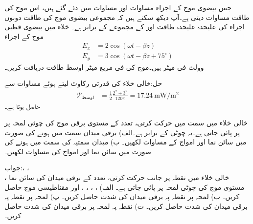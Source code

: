 جس بیضوی موج کے اجزاء مساوات  اور مساوات  میں دئے گئے ہیں، اس موج کی طاقت مساوات  دیتی ہے۔آپ دیکھ سکتے ہیں کہ مجموعی بیضوی موج کی طاقت دونوں اجزاء کی علیحدہ علیحدہ طاقت  اور  کے مجموعے کے برابر ہے۔
خلاء میں بیضوی قطبی موج کے اجزاء
\begin{align*}
E_x&=2 \cos (\omega t -\beta z)\\
E_y&=3 \cos (\omega t -\beta z+75^{\circ})
\end{align*}
وولٹ فی میٹر ہیں۔موج کی فی مربع میٹر اوسط طاقت دریافت کریں۔

حل:خالی خلاء کی قدرتی رکاوٹ  لیتے ہوئے مساوات 
سے
\begin{align*}
\mathscr{P}_{\text{اوسط}}&=\frac{1}{2} \frac{2^2+3^2}{120\pi}=\SI{17.24}{\milli \watt \per \meter \squared}
\end{align*}
حاصل ہوتا ہے۔

\newpage
{}

خالی خلاء میں  سمت میں حرکت کرتی،  تعدد  کے مستوی برقی موج  کی  چوٹی لمحہ  پر   پر پائی جاتی ہے۔یہ چوٹی  کے برابر ہے۔الف) برقی میدان  سمت میں ہونے کی صورت میں سائن نما   اور  امواج کے مساوات لکھیں۔ ب) میدان سمتیہ  کی سمت میں ہونے کی صورت
 میں سائن نما   اور   امواج کی مساوات لکھیں۔

جواب:، ،\\ ،  
خالی خلاء میں  نقطہ  پر  جانب حرکت کرتی،  تعدد کے برقی میدان کی سائن نما مستوی موج کی چوٹی لمحہ  پر  پائی جاتی ہے۔ الف) ، ، ، ،  اور مقناطیسی موج  حاصل کریں۔  ب) لمحہ  پر نقطہ  پہ برقی میدان کی شدت  حاصل کریں۔ پ) لمحہ  پر نقطہ  پہ برقی میدان کی شدت  حاصل کریں۔ ت) نقطہ  پہ لمحہ  پر برقی میدان کی شدت حاصل کریں۔ 

